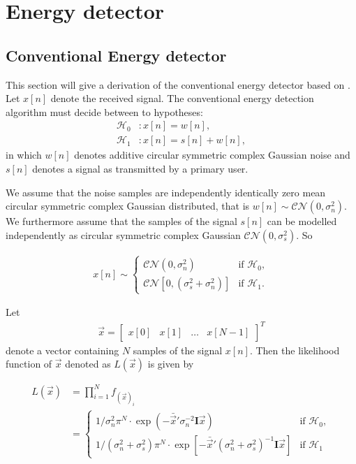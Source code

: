 \documentclass[a4paper, openany, oneside]{memoir}
\begin{document}
\section{Energy detector}

\subsection{Conventional Energy detector}\label{ssec:conv_ed_derivation}
This section will give a derivation of the conventional energy detector based on \cite{atapattu2014energy}.
Let $x[n]$ denote the received signal. The conventional energy detection algorithm must decide between to hypotheses:
\begin{align}\label{eq:hypotheses}
  \mathcal{H}_0&: x[n] = w[n],\\
  \mathcal{H}_1&: x[n] = s[n] + w[n],
\end{align}
in which $w[n]$ denotes additive circular symmetric complex Gaussian noise and $s[n]$ denotes a signal as transmitted by a primary user.

We assume that the noise samples are independently identically zero mean circular symmetric complex Gaussian distributed, that is $w[n] \sim \mathcal{CN}(0, \sigma_n^2)$. 
We furthermore assume that the samples of the signal $s[n]$ can be modelled independently as circular symmetric complex Gaussian $\mathcal{CN}(0, \sigma_s^2)$. %
So

\begin{align*}
x[n] \sim 
    \begin{cases}
        \mathcal{CN}(0, \sigma_n^2) & \text{if $\mathcal{H}_0$}, \\
        \mathcal{CN}[0, (\sigma_s^2 + \sigma_n^2)] & \text{if $\mathcal{H}_1$}.
    \end{cases}
\end{align*} 

Let
\begin{align*}
    \vec{x} = \begin{bmatrix}x[0] & x[1]& \ldots& x[N-1]\end{bmatrix}^T
\end{align*}
denote a vector containing $N$ samples of the signal $x[n]$. Then the likelihood function of $\vec{x}$ denoted as $L(\vec{x})$ is given by

\begin{align*}
    L(\vec{x}) &= \prod_{i=1}^N f_{(\vec{x})_i}\\
    &= \begin{cases}
        1/\sigma_n^2 \pi^N \cdot \exp(-\bar{\vec{x}}'\sigma_n^{-2}\mathbf{I}\vec{x}) & \text{if $\mathcal{H}_0$}, \\
        1/(\sigma_n^2 + \sigma_s^2) \pi^N \cdot \exp[-\bar{\vec{x}}'(\sigma_n^2+\sigma_s^2)^{-1}\mathbf{I}\vec{x}] & \text{if $\mathcal{H}_1$}
    \end{cases}
\end{align*}
\end{document}
